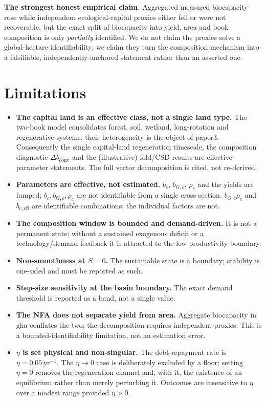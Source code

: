\documentclass[11pt]{article}
\begin{document}
\noindent\textbf{The strongest honest empirical claim.} Aggregated measured biocapacity rose while independent
ecological-capital proxies either fell or were not recoverable, but the exact split of biocapacity into yield,
area and book composition is only \emph{partially} identified. We do not claim the proxies solve a global-hectare
identifiability; we claim they turn the composition mechanism into a falsifiable, independently-anchored
statement rather than an asserted one.

\section{Limitations}

\begin{itemize}
\item \textbf{The capital land is an effective class, not a single land type.} The two-book model consolidates forest, soil, wetland, long-rotation and regenerative systems; their heterogeneity is the object of paper3. Consequently the single capital-land regeneration timescale, the composition diagnostic $\Delta b_{\mathrm{conv}}$ and the (illustrative) fold/CSD results are effective-parameter statements. The full vector decomposition is cited, not re-derived.
\item \textbf{Parameters are effective, not estimated.} $b_c$, $b_{G,c}$, $\rho_c$ and the yields are lumped; $b_c,b_{G,c},\rho_c$ are not identifiable from a single cross-section. $b_{G,c}\rho_c$ and $b_{c,\mathrm{eff}}$ are identifiable combinations; the individual factors are not.
\item \textbf{The composition window is bounded and demand-driven.} It is not a permanent state; without a sustained exogenous deficit or a technology/demand feedback it is attracted to the low-productivity boundary.
\item \textbf{Non-smoothness at $S=0$.} The sustainable state is a boundary; stability is one-sided and must be reported as such.
\item \textbf{Step-size sensitivity at the basin boundary.} The exact demand threshold is reported as a band, not a single value.
\item \textbf{The NFA does not separate yield from area.} Aggregate biocapacity in gha conflates the two; the decomposition requires independent proxies. This is a bounded-identifiability limitation, not an estimation error.
\item \textbf{$\eta$ is set physical and non-singular.} The debt-repayment rate is $\eta=0.05\,\text{yr}^{-1}$. The $\eta\to0$ case is deliberately excluded by a floor; setting $\eta=0$ removes the regeneration channel and, with it, the existence of an equilibrium rather than merely perturbing it. Outcomes are insensitive to $\eta$ over a modest range provided $\eta>0$.

\end{itemize}
\end{document}
